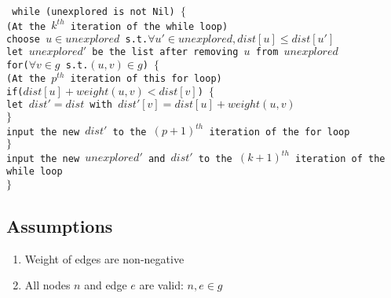 \documentclass[11pt, oneside]{article}   	%
\newcommand\tab[1][1cm]{\hspace*{#1}}
\theoremstyle{definition}
\begin{document}
\texttt{
  \tab while (unexplored is not Nil) 
  \tab$\{$ \\
  \tab\tab (At the $k^{th}$ iteration of the while loop)                                          \\
  \tab\tab choose $u \in unexplored$ s.t.$\forall u' \in unexplored, dist[u] \leq dist[u']$     \\
  \tab\tab let $unexplored'$ be the list after removing $u$ from $unexplored$                    \\
  \tab\tab for($\forall v \in g$ s.t.$(u, v) \in g$) $\{$                                 \\  
  \tab\tab\tab (At the $p^{th}$ iteration of this for loop)                                \\
  \tab\tab\tab  if($dist[u] + weight(u, v) < dist[v]$) $\{$                              \\
  \tab\tab\tab\tab  let $dist' = dist$ with $dist'[v] = dist[u] + weight(u, v)$          \\
  \tab\tab\tab $\}$ \\ 
  \tab\tab\tab input the new $dist'$ to the $(p+1)^{th}$ iteration of the for loop \\
  \tab\tab $\}$ \\
  \tab\tab input the new $unexplored'$ and $dist'$ to the $(k+1)^{th}$ iteration of the while loop \\
  \tab $\}$
}

\subsection{Assumptions}
\begin{enumerate}
  \item Weight of edges are non-negative
  \item All nodes $n$ and edge $e$ are valid: $n, e \in g$
\end{enumerate}
\end{document}
